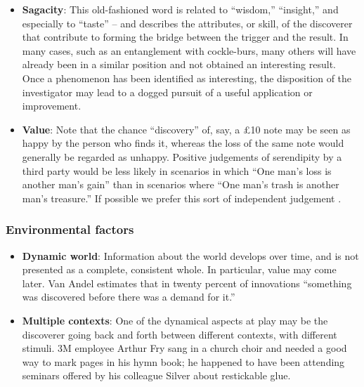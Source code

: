 \begin{itemize}
\item \textbf{Sagacity}: This old-fashioned word is related to
  ``wisdom,'' ``insight,'' and especially to ``taste'' -- and
  describes the attributes, or skill, of the discoverer that
  contribute to forming the bridge between the trigger and the result.
  In many cases, such as an entanglement with cockle-burs, many others
  will have already been in a similar position and not obtained an
  interesting result.  Once a phenomenon has been identified as
  interesting, the disposition of the investigator may lead to a
  dogged pursuit of a useful application or improvement.
\end{itemize}

\begin{itemize}
\item \textbf{Value}: Note that the chance ``discovery'' of, say, a
  \pounds 10 note may be seen as happy by the person who finds it,
  whereas the loss of the same note would generally be regarded as
  unhappy.  Positive judgements of serendipity by a third party would
  be less likely in scenarios in which ``One man's loss is another
  man's gain'' than in scenarios where ``One man's trash is another
  man's treasure.''  If possible we prefer this sort of independent
  judgement \cite{jordanous:12}.
\end{itemize}

\subsubsection*{Environmental factors}

\begin{itemize}
\item \textbf{Dynamic world}: Information about the world develops
  over time, and is not presented as a complete, consistent whole.  In
  particular, value may come later.  Van Andel
  \citeyear[p. 643]{van1994anatomy} estimates that in twenty percent
  of innovations ``something was discovered before there was a demand
  for it.''
\end{itemize}

\begin{itemize}
\item \textbf{Multiple contexts}: One of the dynamical aspects at play
  may be the discoverer going back and forth between different
  contexts, with different stimuli.  3M employee Arthur Fry sang in a
  church choir and needed a good way to mark pages in his hymn book;
  he happened to have been attending seminars offered by his colleague
  Silver about restickable glue.
\end{itemize}

